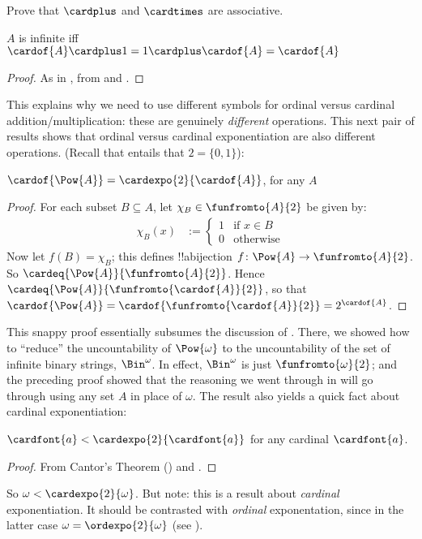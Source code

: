 \documentclass[../../../include/open-logic-section]{subfiles}
\begin{document}
\begin{prob}
	Prove that $\cardplus$ and $\cardtimes$ are associative.
\end{prob}
\begin{prop}
	$A$ is infinite iff $\cardof{A} \cardplus 1 = 1 \cardplus \cardof{A} = \cardof{A}$
\end{prop}
\begin{proof}
	As in , from  and . 
\end{proof}\noindent
This explains why we need to use different symbols for ordinal versus cardinal addition/multiplication: these are genuinely \emph{different} operations. This next pair of results shows that ordinal versus cardinal exponentiation are also different operations. (Recall that   entails that $2 = \{0, 1\}$):
\begin{lem}$\cardof{\Pow{A}} = \cardexpo{2}{\cardof{A}}$, for any $A$
\end{lem}
\begin{proof}
	For each subset $B \subseteq A$, let $\chi_B \in \funfromto{A}{2}$ be given by:
	\begin{align*}
		\chi_{B}(x) &:=
		\begin{cases}
			1 & \text{if }x\in B\\
			0 & \text{otherwise}
		\end{cases}
	\end{align*}
	Now let $f(B) = \chi_B$; this defines !!a{bijection} $f \colon \Pow{A} \to \funfromto{A}{2}$. So $\cardeq{\Pow{A}}{\funfromto{A}{2}}$. Hence $\cardeq{\Pow{A}}{\funfromto{\cardof{A}}{2}}$, so that $\cardof{\Pow{A}} = \cardof{\funfromto{\cardof{A}}{2}} = 2^{\cardof{A}}$.
\end{proof}\noindent
This snappy proof essentially subsumes the discussion of . There, we showed how to ``reduce'' the uncountability of $\Pow{\omega}$ to the uncountability of the set of infinite binary strings, $\Bin^\omega$. In effect, $\Bin^{\omega}$ is just $\funfromto{\omega}{2}$; and the preceding proof showed that the reasoning we went through in  will go through using any set $A$ in place of $\omega$. The result also yields a quick fact about cardinal exponentiation:
\begin{cor}$\cardfont{a} < \cardexpo{2}{\cardfont{a}}$ for any cardinal $\cardfont{a}$.
\end{cor}
\begin{proof}
	From Cantor's Theorem () and .
\end{proof}\noindent
So $\omega < \cardexpo{2}{\omega}$. But note: this is a result about \emph{cardinal} exponentiation. It should be contrasted with \emph{ordinal} exponentation, since in the latter case $\omega = \ordexpo{2}{\omega}$ (see 
).
\end{document}
